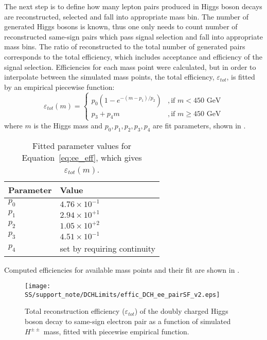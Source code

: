 The next step is to define how many lepton pairs produced in Higgs boson decays are reconstructed, selected and fall into appropriate mass bin.
The number of generated Higgs bosons is known, 
thus one only needs to count number of reconstructed same-sign pairs which pass signal selection and fall into appropriate mass bins.
The ratio of reconstructed to the total number of generated pairs corresponds to the total efficiency, which includes acceptance and efficiency of the signal selection.
Efficiencies for each mass point were calculated, but in order to interpolate between the simulated mass points, the total efficiency, $\varepsilon_{tot}$, is fitted by
an empirical piecewise function:
\begin{equation}
\varepsilon_{tot}(m) = \begin{cases} p_{0} (1-e^{-(m-p_{1})/p_{2}}) & ,\mbox{if } m < 450\mbox{ GeV} \\ 
p_{3} + p_{4} m & ,\mbox{if } m \geq 450\mbox{ GeV} \end{cases}
\label{eq:ee_eff}
\end{equation}
where $m$ is the Higgs mass and $p_{0}, p_{1}, p_{2}, p_{3}, p_{4}$ are fit parameters, shown in .
\begin{table}[htbp]
    \begin{center}
    \begin{tabular}{ l | l }
        \hline
        Parameter & Value \\
        \hline
        $p_{0}$    & $4.76 \times 10^{-1}$ \\[+0.05in]
        $p_{1}$    & $2.94 \times 10^{+1}$ \\[+0.05in]
        $p_{2}$    & $1.05 \times 10^{+2}$ \\[+0.05in]
        $p_{3}$    & $4.51 \times 10^{-1}$ \\[+0.05in]
        $p_{4}$    & set by requiring continuity \\[+0.05in]
        \hline
    \end{tabular}
    \end{center}
    \caption{Fitted parameter values for Equation~\ref{eq:ee_eff}, which gives $\varepsilon_{tot}(m)$.}
    \label{tab:ee_eff_params}
\end{table}

Computed efficiencies for available mass points and their fit are shown in .

\begin{figure}[h]
\begin{center}
\texttt{[image: SS/support\_note/DCHLimits/effic\_DCH\_ee\_pairSF\_v2.eps]}
\caption{Total reconstruction efficiency ($\varepsilon_{tot}$) of the doubly charged Higgs boson decay to same-sign electron pair as a function of simulated $H^{\pm\pm}$ mass, fitted with piecewise empirical function.}
\label{fig:signal_efficiency}
\end{center}
\end{figure}

